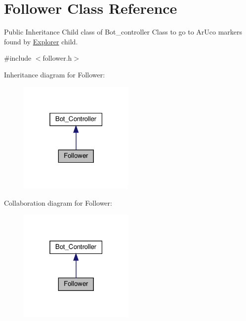 \hypertarget{class_follower}{}\section{Follower Class Reference}
\label{class_follower}


Public Inheritance Child class of Bot\+\_\+controller Class to go to Ar\+Uco markers found by \hyperlink{class_explorer}{Explorer} child.  




{\ttfamily \#include $<$follower.\+h$>$}



Inheritance diagram for Follower\+:
\nopagebreak
\begin{figure}[H]
\begin{center}
\leavevmode
\includegraphics[width=159pt]{class_follower__inherit__graph}
\end{center}
\end{figure}


Collaboration diagram for Follower\+:
\nopagebreak
\begin{figure}[H]
\begin{center}
\leavevmode
\includegraphics[width=159pt]{class_follower__coll__graph}
\end{center}
\end{figure}

